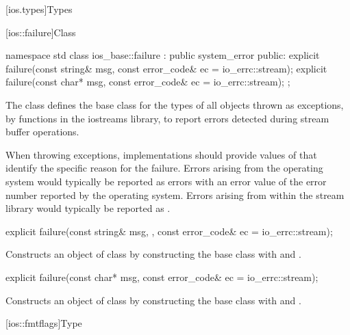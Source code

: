 [ios.types]{Types}

[ios::failure]{Class }

%
\begin{codeblock}
namespace std {
  class ios_base::failure : public system_error {
  public:
    explicit failure(const string& msg, const error_code& ec = io_errc::stream);
    explicit failure(const char* msg, const error_code& ec = io_errc::stream);
  };
}
\end{codeblock}

\pnum
The class
defines the base class
for the types of all objects thrown as exceptions,
by functions in the iostreams library,
to report errors detected during stream buffer operations.

\pnum
When throwing  exceptions, implementations should provide
values of  that identify the specific reason for the failure. \enternote
Errors arising from the operating system would typically be reported as
 errors with an error value of the error number
reported by the operating system. Errors arising from within the stream library would
typically be reported as . \exitnote

%
\begin{itemdecl}
explicit failure(const string& msg, , const error_code& ec = io_errc::stream);
\end{itemdecl}

\begin{itemdescr}
\pnum
\effects
Constructs an object of class
 by constructing the base class with  and .
\end{itemdescr}

%
\begin{itemdecl}
explicit failure(const char* msg, const error_code& ec = io_errc::stream);
\end{itemdecl}

\begin{itemdescr}
\pnum
\effects
Constructs an object of class
 by constructing the base class with  and .
\end{itemdescr}

[ios::fmtflags]{Type }


